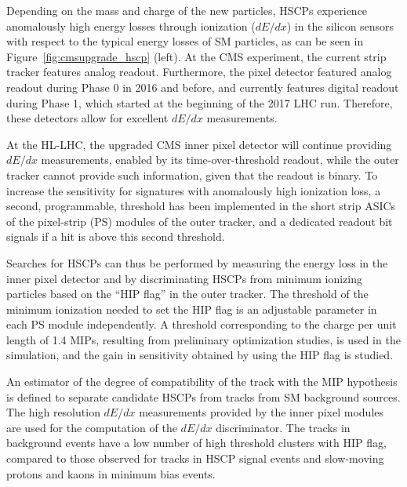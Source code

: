 Depending on the mass and charge of the new particles, HSCPs experience anomalously high energy losses through ionization ($dE/dx$) in the silicon sensors with respect to the typical energy losses of SM particles, as can be seen in Figure~\ref{fig:cmsupgrade_hscp} (left). At the CMS experiment, the current strip tracker features analog readout. Furthermore, the pixel detector featured analog readout during Phase 0 in 2016 and before, and currently features digital readout during Phase 1, which started at the beginning of the 2017 LHC run. Therefore, these detectors allow for excellent $dE/dx$ measurements.

At the HL-LHC, the upgraded CMS inner pixel detector will continue providing $dE/dx$ measurements, enabled by its time-over-threshold readout, while the outer tracker cannot provide such information, given that the readout is binary. To increase the sensitivity for signatures with anomalously high ionization loss, a second, programmable, threshold has been implemented in the short strip ASICs of the pixel-strip (PS) modules of the outer tracker, and a dedicated readout bit signals if a hit is above this second threshold.

Searches for HSCPs can thus be performed by measuring the energy loss in the inner pixel detector and by discriminating HSCPs from minimum ionizing particles based on the ``HIP flag'' in the outer tracker. The threshold of the minimum ionization needed to set the HIP flag is an adjustable parameter in each PS module independently. A threshold corresponding to the charge per unit length of 1.4 MIPs, resulting from preliminary optimization studies, is used in the simulation, and the gain in sensitivity obtained by using the HIP flag is studied.

An estimator of the degree of compatibility of the track with the MIP hypothesis is defined to separate candidate HSCPs from tracks from SM background sources. The high resolution $dE/dx$ measurements provided by the inner pixel modules are used for the computation of the $dE/dx$ discriminator. The tracks in background events have a low number of high threshold clusters with HIP flag, compared to those observed for tracks in HSCP signal events and slow-moving protons and kaons in minimum bias events.


